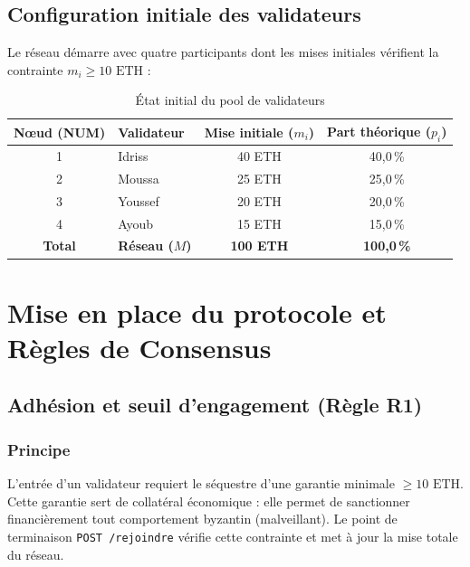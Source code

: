 \documentclass[11pt,a4paper]{article}
\begin{document}
\subsection{Configuration initiale des validateurs}
Le réseau démarre avec quatre participants dont les mises initiales vérifient la contrainte $m_i \ge 10\text{ ETH}$ :

\begin{table}[H]
\centering
\begin{tabular}{@{}clcc@{}}
\toprule
\textbf{Nœud (NUM)} & \textbf{Validateur} & \textbf{Mise initiale ($m_i$)} & \textbf{Part théorique ($p_i$)} \\
\midrule
1 & Idriss  & 40 ETH & 40,0\,\% \\
2 & Moussa  & 25 ETH & 25,0\,\% \\
3 & Youssef & 20 ETH & 20,0\,\% \\
4 & Ayoub   & 15 ETH & 15,0\,\% \\
\midrule
\textbf{Total} & \textbf{Réseau ($M$)} & \textbf{100 ETH} & \textbf{100,0\,\%} \\
\bottomrule
\end{tabular}
\caption{État initial du pool de validateurs}
\label{tab:validateurs_init}
\end{table}

\section{Mise en place du protocole et Règles de Consensus}

\subsection{Adhésion et seuil d'engagement (Règle R1)}

\subsubsection*{Principe}
L'entrée d'un validateur requiert le séquestre d'une garantie minimale $\ge 10\text{ ETH}$. Cette garantie sert de collatéral économique : elle permet de sanctionner financièrement tout comportement byzantin (malveillant). Le point de terminaison \texttt{POST /rejoindre} vérifie cette contrainte et met à jour la mise totale du réseau.
\end{document}
